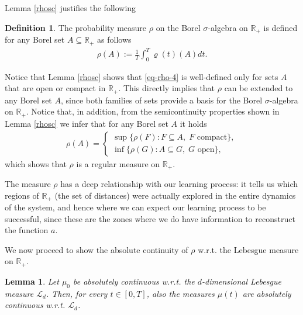 \documentclass[A4paper,11pt]{article}
\newtheorem{lemma}[theorem]{Lemma}
\theoremstyle{definition}
\newtheorem{definition}[theorem]{Definition}
\newcommand{\R}{\mathbb{R}}
\newcommand{\cl}{\mathcal{L}}
\begin{document}
Lemma \ref{rhosc} justifies the following
\begin{definition}
The probability measure $\rho$ on the Borel $\sigma$-algebra on $\R_+$ is defined for any Borel set $A \subseteq \R_+$ as follows
\begin{align}\label{eq-rho-4}
	\rho(A):=\frac{1}{T}\int_0^T\varrho(t)(A)dt.
\end{align}
\end{definition}
Notice that Lemma \ref{rhosc} shows that \eqref{eq-rho-4} is well-defined only for sets $A$ that are open or compact in $\R_+$. This directly implies that $\rho$ can be extended to any Borel set $A$, since both families of sets provide a basis for the Borel $\sigma$-algebra on $\R_+$. Notice that, in addition, from the semicontinuity properties shown in Lemma \ref{rhosc} we infer that for any Borel set $A$ it holds
\begin{align*}
	\rho(A) = \begin{cases}
	\sup\{\rho(F) : F \subseteq A, \;F \text{ compact}\},\\
	\inf\{\rho(G) : A \subseteq G, \;G \text{ open}\},
	\end{cases}
\end{align*}
which shows that $\rho$ is a regular measure on $\R_+$.

\vspace{0.3cm}

The measure $\rho$ has a deep relationship with our learning process: it tells us which regions of $\R_+$ (the set of distances) were actually explored in the entire dynamics of the system, and hence where we can expect our learning process to be successful, since these are the zones where we do have information to reconstruct the function $a$.

We now proceed to show the absolute continuity of $\rho$ w.r.t. the Lebesgue measure on $\R_+$.

\begin{lemma}\label{lemma-AC-1}
	Let $\mu_0$ be absolutely continuous w.r.t. the $d$-dimensional Lebesgue measure $\cl_d$. Then, for every
	$t\in [0,T]$, also the measures $\mu(t)$ are absolutely continuous w.r.t. $\cl_d$.
\end{lemma}
\end{document}
